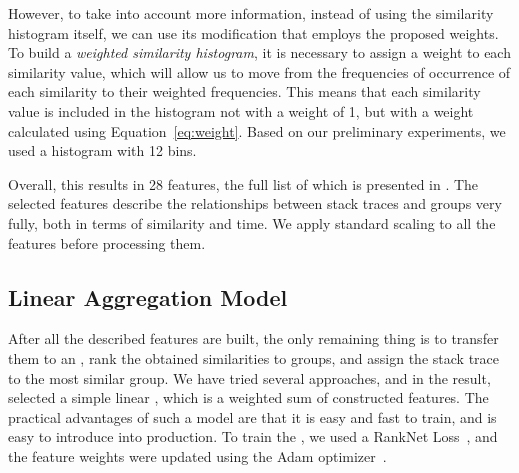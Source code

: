 However, to take into account more information, instead of using the similarity histogram itself, we can use its modification that employs the proposed weights. To build a \textit{weighted similarity histogram}, it is necessary to assign a weight to each similarity value, which will allow us to move from the frequencies of occurrence of each similarity to their weighted frequencies. This means that each similarity value is included in the histogram not with a weight of 1, but with a weight calculated using Equation~\ref{eq:weight}. Based on our preliminary experiments, we used a histogram with 12 bins. 

Overall, this results in 28 features, the full list of which is presented in . The selected features describe the relationships between stack traces and groups very fully, both in terms of similarity and time. We apply standard scaling to all the features before processing them.

\subsection{Linear Aggregation Model}

After all the described features are built, the only remaining thing is to transfer them to an \ag, rank the obtained similarities to groups, and assign the stack trace to the most similar group. We have tried several approaches, and in the result, selected a simple linear \ag, which is a weighted sum of constructed features. The practical advantages of such a model are that it is easy and fast to train, and is easy to introduce into production. To train the \ag, we used a RankNet Loss~\cite{ranknet}, and the feature weights were updated using the Adam optimizer~\cite{adam}.
